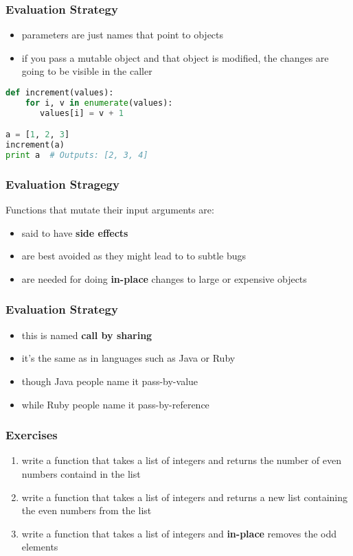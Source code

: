 \documentclass{beamer}
\begin{document}
\begin{frame}[fragile]
\frametitle{Evaluation Strategy}

\begin{itemize}
  \item parameters are just names that point to objects
  \item if you pass a mutable object and that object is modified, the changes are going
    to be visible in the caller
\end{itemize}
\pause
\begin{lstlisting}[language=python]
def increment(values):
    for i, v in enumerate(values):
       values[i] = v + 1

a = [1, 2, 3]
increment(a)
print a  # Outputs: [2, 3, 4]
\end{lstlisting}
\end{frame}

\begin{frame}[fragile]
\frametitle{Evaluation Stragegy}

Functions that mutate their input arguments are:

\begin{itemize}
  \item said to have {\bf side effects}
  \item are best avoided as they might lead to to subtle bugs
  \item are needed for doing {\bf in-place} changes to large or expensive objects
\end{itemize}

\end{frame}


\begin{frame}[fragile]
\frametitle{Evaluation Strategy}

\begin{itemize}
  \item this is named {\bf call by sharing}
  \item it's the same as in languages such as Java or Ruby
  \item though Java people name it pass-by-value
  \item while Ruby people name it pass-by-reference
\end{itemize}
\end{frame}


\begin{frame}[fragile]
\frametitle{Exercises}

\begin{enumerate}
  \item write a function that takes a list of integers and returns the number of even numbers containd in the list
  \item write a function that takes a list of integers and returns a new list containing the even numbers from the list
  \item write a function that takes a list of integers and {\bf in-place} removes the odd elements
\end{enumerate}

\end{frame}
\end{document}
